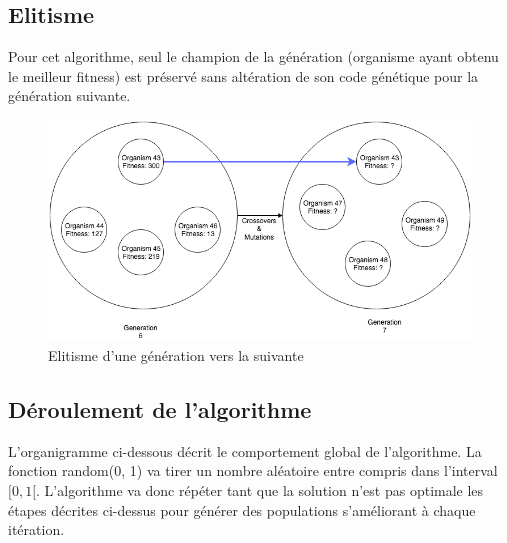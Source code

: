 \documentclass{article}
\begin{document}
\subsection{Elitisme}

Pour cet algorithme, seul le champion de la génération (organisme ayant obtenu le meilleur fitness) est préservé sans altération de son code génétique pour la génération suivante.

\begin{figure}[H]
\begin{center}
	\includegraphics[scale=0.5]{elitism.png}
	\caption{Elitisme d'une génération vers la suivante}
\end{center}
\end{figure}

\subsection{Déroulement de l'algorithme}

L'organigramme ci-dessous décrit le comportement global de l'algorithme. La fonction random(0, 1) va tirer un nombre aléatoire entre compris dans l'interval $[0, 1[$. L'algorithme va donc répéter tant que la solution n'est pas optimale les étapes décrites ci-dessus pour générer des populations s'améliorant à chaque itération.
\end{document}

